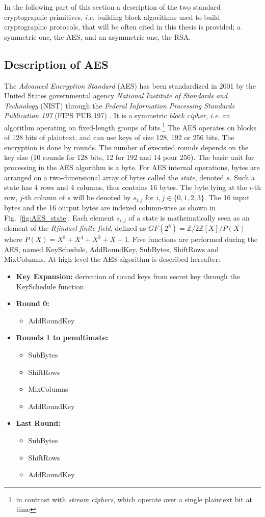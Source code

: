 In the following part of this section a description of the two standard cryptographic primitives, \emph{i.e.} building block algorithms used to build cryptographic protocols, that will be often cited in this thesis is provided; a symmetric one, the AES, and an asymmetric one, the RSA. 
\subsection{Description of AES}
The \emph{Advanced Encryption Standard} (AES) has been standardized in 2001 by the United States governmental agency \emph{National Institute of Standards and Technology} (NIST) through the \emph{Federal Information
Processing Standards Publication 197 } (FIPS PUB 197) \cite{nist197}. It is a symmetric \emph{block cipher}, \emph{i.e.} an algorithm operating on fixed-length groups of bits.\footnote{in contrast with \emph{stream ciphers}, which operate over a single plaintext bit at time} The AES operates on blocks of 128 bits of plaintext, and can use keys of size 128, 192 or 256 bits. The encryption is done by rounds. The number of executed rounds depends on the key size (10 rounds for 128 bits, 12 for 192 and 14 pour 256). The basic unit for processing in the AES algorithm is a byte. For AES internal operations, bytes are arranged on a two-dimensional array of bytes called the \emph{state}, denoted $s$. Such a state has 4 rows and 4 columns, thus contains 16 bytes. The byte lying at the $i$-th row, $j$-th column of $s$ will be denoted by $s_{i,j}$ for $i,j\in\{0,1,2,3\}$. The 16 input bytes and the 16 output bytes are indexed column-wise as shown in Fig.~\ref{fig:AES_state}. Each element $s_{i,j}$ of a state is mathematically seen as an element of the \emph{Rjindael finite field}, defined as $GF(2^8) = \mathbb{Z}/{2\mathbb{Z}[X]}/P(X)$ where $P(X) = X^8 + X^4 + X^3 + X + 1$. Five functions are performed during the AES, named KeySchedule, AddRoundKey, SubBytes, ShiftRows and MixColumns. At high level the AES algorithm is described hereafter:
\begin{itemize}
\item[]\textbf{Key Expansion:}  derivation of round keys from secret key through the KeySchedule function
\item[]\textbf{Round 0:}  
\begin{itemize}
\item[] AddRoundKey
\end{itemize}
\item[] \textbf{Rounds 1 to penultimate:}
\begin{itemize}
\item[] SubBytes
\item[] ShiftRows
\item[] MixColumns
\item[] AddRoundKey
\end{itemize}
\item[] \textbf{Last Round:}
\begin{itemize}
\item[] SubBytes
\item[] ShiftRows
\item[] AddRoundKey
\end{itemize}
\end{itemize}

